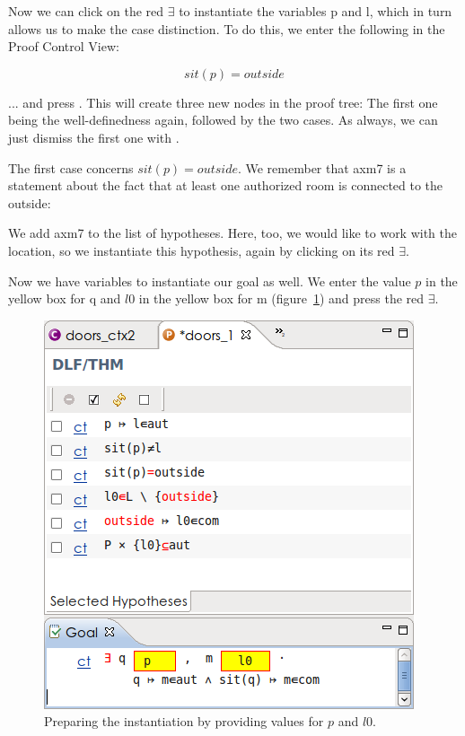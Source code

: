 Now we can click on the red $\exists$ to instantiate the variables p and l, which in turn allows us to make the case distinction. To do this, we enter the following in the Proof Control View:

$$ sit(p) = outside $$

... and press .  This will create three new nodes in the proof tree: The first one being the well-definedness again, followed by the two cases.  As always, we can just dismiss the first one with .

The first case concerns $sit(p) = outside$.  We remember that \textsf{axm7} is a statement about the fact that at least one authorized room is connected to the outside:


We add \textsf{axm7} to the list of hypotheses.  Here, too, we would like to work with the location, so we instantiate this hypothesis, again by clicking on its red $\exists$.


Now we have variables to instantiate our goal as well.  We enter the value $p$ in the yellow box for q and $l0$ in the yellow box for m (figure~\ref{tut_10_ref_proof2}) and press the red  $\exists$.

\begin{figure}[!ht]
\begin{center}
	\includegraphics[]{img/tutorial/tut_10_ref_proof2.png}
	\caption{Preparing the instantiation by providing values for $p$ and $l0$.}
	\label{tut_10_ref_proof2}
\end{center}
\end{figure}

